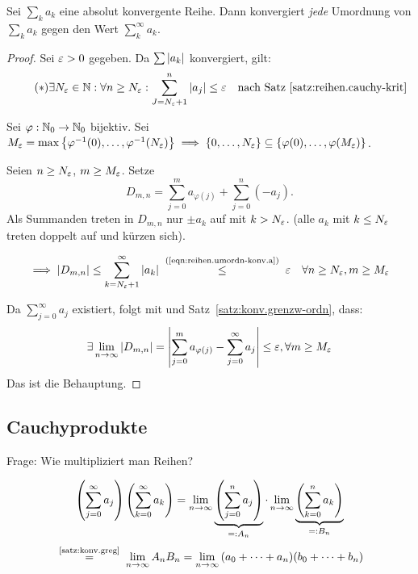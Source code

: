 \documentclass[12pt]{scrreprt}
\begin{document}
\begin{satz}\label{satz:reihen.umordn-konv}
Sei $\sum_k a_k$ eine absolut konvergente Reihe. Dann konvergiert \emph{jede} Umordnung von $\sum_k a_k$
gegen den Wert $\sum^\infty_k a_k$.
\end{satz}
\begin{proof}
Sei $\varepsilon > 0$ gegeben. Da $\sum \left\lvert a_k\right\lvert$ konvergiert, gilt:
\begin{equation}\label{eqn:reihen.umordn-konv.a}\tag{$*$}
\exists N_\varepsilon \in \mathbb{N}: \forall n\ge N_\varepsilon: \sum^n_{J = N_\varepsilon+1} \left\lvert a_j\right\lvert \le \varepsilon\quad \text{nach 
Satz~\ref{satz:reihen.cauchy-krit}}
\end{equation}

\noindent Sei $\varphi: \mathbb{N}_0 \rightarrow \mathbb{N}_0$ bijektiv. Sei $M_\varepsilon = \max \left\{\varphi^{-1}(0), \dotsc, \varphi^{-1}(N_\varepsilon)\right\}
\implies \left\{0, \dotsc, N_\varepsilon\right\} \subseteq \left\{\varphi(0), \dotsc, \varphi(M_\varepsilon)\right\}$.

\bigskip 

\noindent Seien $n \ge N_\varepsilon$, $m\ge M_\varepsilon$. Setze \[D_{m,n} = \sum_{j=0}^m a_{\varphi(j)} + \sum_{j=0}^n (-a_j).\]
Als Summanden treten in $D_{m,n}$ nur $\pm a_k$ auf mit $k > N_\varepsilon$. (alle $a_k$ mit $k \le N_\varepsilon$ treten doppelt
auf und kürzen sich).

\[\folgt \abs{D_{m,n}} \le \sum_{k = N_\ep +1}^\infty \abs{a_k} \nach{\le}{(\ref{eqn:reihen.umordn-konv.a})} \ep
\quad \forall n\ge N_\ep, m\ge M_\ep\]

Da $\sum_{j=0}^\infty a_j$ existiert, folgt mit \ninf{} und Satz~\ref{satz:konv.grenzw-ordn}, dass:
\[\exists\lim_{n\rightarrow\infty}\left\lvert D_{m,n}\right\lvert = \left\lvert\sum_{j=0}^m a_{\varphi(j)} - \sum_{j=0}^\infty a_j\right\lvert \le \varepsilon, \forall m\ge M_\varepsilon\]
Das ist die Behauptung.
\end{proof}

\subsection*{Cauchyprodukte}
Frage: Wie multipliziert man Reihen?

\begin{equation}\label{eqn:reihen.mult-rwert}
\left(\sum_{j=0}^\infty a_j\right)\left(\sum_{k=0}^\infty a_k\right) = \lim_{n\rightarrow\infty}\underbrace{\left(\sum_{j=0}^n a_j\right)}_{=:A_n}
\cdot \lim_{n\rightarrow\infty}\underbrace{\left(\sum_{k=0}^n a_k\right)}_{=:B_n}
\end{equation}
\[\nach{=}{\ref{satz:konv.greg}}\lim_{\ninf}{A_nB_n}=\lim_{\ninf}{(a_0+\dotsb+a_n)(b_0+\dotsb+b_n)}\]
\end{document}
